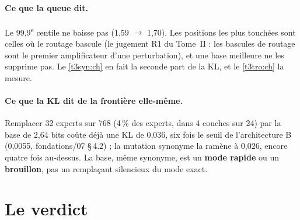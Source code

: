 \paragraph{Ce que la queue dit.} Le 99,9\textsuperscript{e} centile ne baisse pas (1,59 $\to$ 1,70). Les positions les plus touchées sont celles où le routage bascule (le jugement R1 du Tome~II : les bascules de routage sont le premier amplificateur d'une perturbation), et une base meilleure ne les supprime pas. Le \cref{t3syn:ch} en fait la seconde part de la KL, et le \cref{t3tro:ch} la mesure.

\paragraph{Ce que la KL dit de la frontière elle-même.} Remplacer 32 experts sur 768 (4\,\% des experts, dans 4 couches sur 24) par la base de 2,64 bits coûte déjà une KL de 0,036, six fois le seuil de l'architecture B (0,0055, fondations/07 §\,4.2) ; la mutation synonyme la ramène à 0,026, encore quatre fois au-dessus. La base, même synonyme, est un \textbf{mode rapide} ou un \textbf{brouillon}, pas un remplaçant silencieux du mode exact.

\section{Le verdict}\label{t3ecl:sec:verdict}

